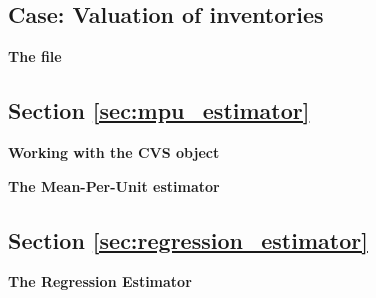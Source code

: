\subsection{Case: Valuation of inventories}

\begin{exercise}
\label{ex:inventoryData}

\textbf{The  file}



\end{exercise}

\subsection{Section \ref{sec:mpu_estimator}}

\begin{exercise}
\label{ex:working_with_objects}

\textbf{Working with the CVS object}









\end{exercise}

\begin{exercise}
\label{ex:mpu_estimator}

\textbf{The Mean-Per-Unit estimator}






\end{exercise}

\subsection{Section \ref{sec:regression_estimator}}

\begin{exercise}
\label{ex:regression_estimator}

\textbf{The Regression Estimator}





\end{exercise}

